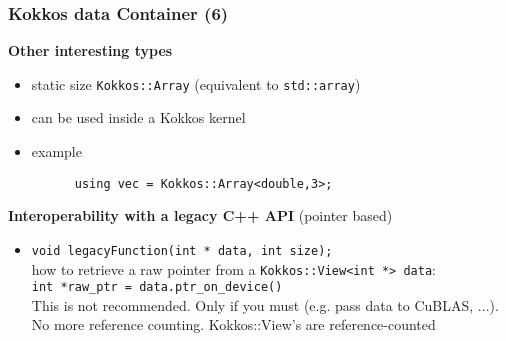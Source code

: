 \begin{frame}[fragile=singleslide]
  \frametitle{Kokkos data Container (6)}

  {\Large \bf Other interesting types}
  \begin{itemize}
  \item static size \texttt{Kokkos::Array} (equivalent to \texttt{std::array})
  \item can be used inside a Kokkos kernel
  \item example
    \begin{verbatim}
      using vec = Kokkos::Array<double,3>;
    \end{verbatim}
  \end{itemize}

  {\Large \bf Interoperability with a legacy C++ API} (pointer based)

  \begin{itemize}
  \item \texttt{void legacyFunction(int * data, int size);}\\
    how to retrieve a raw pointer from a \texttt{Kokkos::View<int *> data}:\\
    \texttt{int *raw\_ptr = data.ptr\_on\_device()} \\
    This is not recommended. Only if you must (e.g. pass data to CuBLAS, ...).\\
    No more reference counting. Kokkos::View's are reference-counted
  \end{itemize}

\end{frame}

